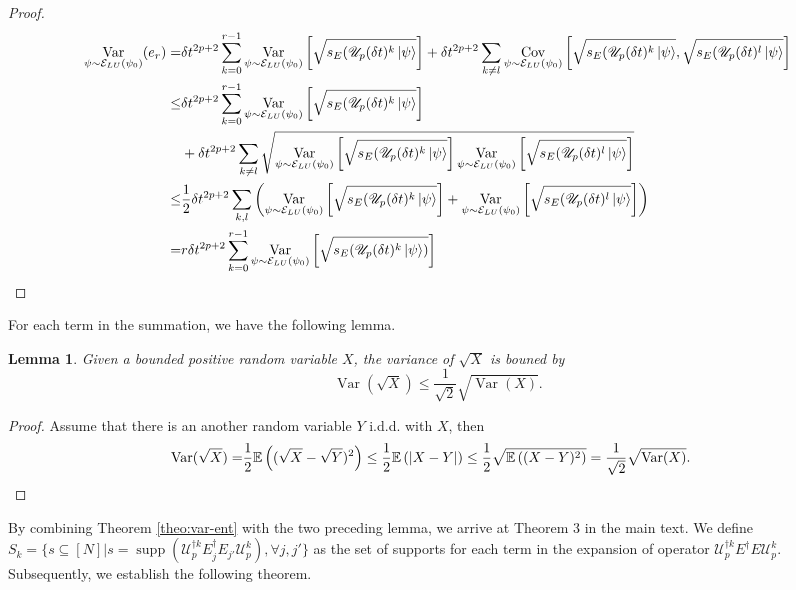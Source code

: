 \documentclass[showpacs,amsmath,amssymb,twocolumn,aps,pra,superscriptaddress,notitlepage,10pt]{revtex4-2}
\newcommand{\bE}{\mathbb E}
\newcommand{\cE}{\mathcal E_{LU}}
\newcommand{\sU}{\mathscr U}
\newtheorem{lemma}{Lemma}
\begin{document}
\begin{proof}
    \begin{align}
    \mathop{\operatorname{Var}}_{\psi\sim\cE(\psi_0)}(e_r)=&\delta t^{2p+2}\sum_{k=0}^{r-1}\mathop{\operatorname{Var}}_{\psi\sim\cE(\psi_0)}\left[\sqrt{s_E(\sU_p(\delta t)^k\ket{\psi}}\right]+\delta t^{2p+2}\sum_{k\ne l}\mathop{\operatorname{Cov}}_{\psi\sim\cE(\psi_0)}\left[\sqrt{s_E(\sU_p(\delta t)^k\ket{\psi}},\sqrt{s_E(\sU_p(\delta t)^l\ket{\psi}}\right]\notag\\
    \le&\delta t^{2p+2}\sum_{k=0}^{r-1}\mathop{\operatorname{Var}}_{\psi\sim\cE(\psi_0)}\left[\sqrt{s_E(\sU_p(\delta t)^k\ket{\psi}}\right]\\
    &+\delta t^{2p+2}\sum_{k\ne l}\sqrt{\mathop{\operatorname{Var}}_{\psi\sim\cE(\psi_0)}\left[\sqrt{s_E(\sU_p(\delta t)^k\ket{\psi}}\right]\mathop{\operatorname{Var}}_{\psi\sim\cE(\psi_0)}\left[\sqrt{s_E(\sU_p(\delta t)^l\ket{\psi}}\right]}\notag\\
    \le&\frac{1}{2}\delta t^{2p+2}\sum_{k,l}\left(\mathop{\operatorname{Var}}_{\psi\sim\cE(\psi_0)}\left[\sqrt{s_E(\sU_p(\delta t)^k\ket{\psi}}\right]+\mathop{\operatorname{Var}}_{\psi\sim\cE(\psi_0)}\left[\sqrt{s_E(\sU_p(\delta t)^l\ket{\psi}}\right]\right)\\
    =&r\delta t^{2p+2}\sum_{k=0}^{r-1}\mathop{\operatorname{Var}}_{\psi\sim\cE(\psi_0)}\left[\sqrt{s_E(\sU_p(\delta t)^k\ket{\psi})}\right]
    \end{align}
\end{proof}
For each term in the summation, we have the following lemma.
\begin{lemma}\label{aplem:sqrt_X_var}
Given a bounded positive random variable $X$, the variance of $\sqrt{X}$ is bouned by
    \begin{equation}
        \operatorname{Var}(\sqrt{X})\le\frac{1}{\sqrt 2}\sqrt{\operatorname{Var}(X)}.
    \end{equation}
\end{lemma}
\begin{proof}
Assume that there is an another random variable $Y$ i.d.d. with $X$, then
    \begin{align}
        \operatorname{Var}(\sqrt{X})=&\frac{1}{2}\bE\left((\sqrt{X}-\sqrt Y)^2\right)
        \le \frac{1}{2}\bE\left(\abs{X-Y}\right)
        \le \frac{1}{2}\sqrt{\bE\left((X-Y)^2\right)}=\frac{1}{\sqrt 2}\sqrt{\operatorname{Var}(X)}.
    \end{align}
\end{proof}
By combining Theorem \ref{theo:var-ent} with the two preceding lemma, we arrive at Theorem 3 in the main text. We define $S_k=\{s\subseteq[N]|s=\operatorname{supp}(\sU_p^{\dagger k}E_j^\dagger E_{j'}\sU_p^k),\forall j,j'\}$ as the set of supports for each term in the expansion of operator $\sU_p^{\dagger k}E^\dagger E\sU_p^k$. Subsequently, we establish the following theorem.
\end{document}
